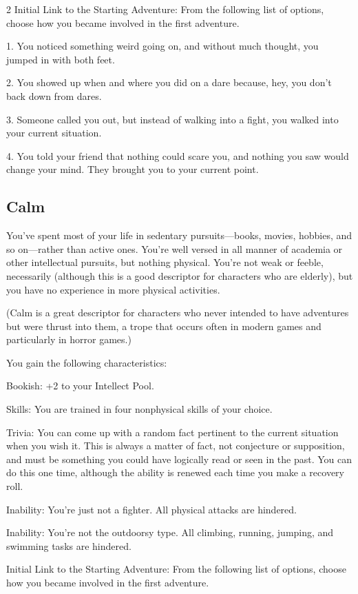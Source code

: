 \begin{multicols}{2}
Initial Link to the Starting Adventure: From the following list of options, choose how you became involved in the first adventure.

1. You noticed something weird going on, and without much thought, you jumped in with both feet.

2. You showed up when and where you did on a dare because, hey, you don’t back down from dares.

3. Someone called you out, but instead of walking into a fight, you walked into your current situation.

4. You told your friend that nothing could scare you, and nothing you saw would change your mind. They brought you to your current point.

\subsection{Calm}

You’ve spent most of your life in sedentary pursuits—books, movies, hobbies, and so on—rather than active ones. You’re well versed in all manner of academia or other intellectual pursuits, but nothing physical. You’re not weak or feeble, necessarily (although this is a good descriptor for characters who are elderly), but you have no experience in more physical activities.

(Calm is a great descriptor for characters who never intended to have adventures but were thrust into them, a trope that occurs often in modern games and particularly in horror games.)

You gain the following characteristics:

Bookish: +2 to your Intellect Pool.

Skills: You are trained in four nonphysical skills of your choice.

Trivia: You can come up with a random fact pertinent to the current situation when you wish it. This is always a matter of fact, not conjecture or supposition, and must be something you could have logically read or seen in the past. You can do this one time, although the ability is renewed each time you make a recovery roll. 

Inability: You’re just not a fighter. All physical attacks are hindered.

Inability: You’re not the outdoorsy type. All climbing, running, jumping, and swimming tasks are hindered.

Initial Link to the Starting Adventure: From the following list of options, choose how you became involved in the first adventure.


\end{multicols}
